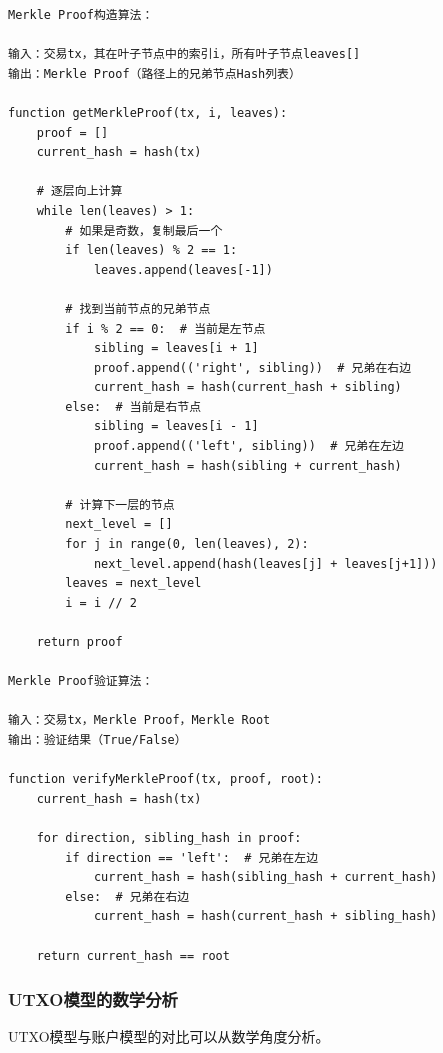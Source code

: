﻿\documentclass[12pt,a4paper]{article}
\begin{document}
\begin{lstlisting}
Merkle Proof构造算法：

输入：交易tx，其在叶子节点中的索引i，所有叶子节点leaves[]
输出：Merkle Proof（路径上的兄弟节点Hash列表）

function getMerkleProof(tx, i, leaves):
    proof = []
    current_hash = hash(tx)
    
    # 逐层向上计算
    while len(leaves) > 1:
        # 如果是奇数，复制最后一个
        if len(leaves) % 2 == 1:
            leaves.append(leaves[-1])
        
        # 找到当前节点的兄弟节点
        if i % 2 == 0:  # 当前是左节点
            sibling = leaves[i + 1]
            proof.append(('right', sibling))  # 兄弟在右边
            current_hash = hash(current_hash + sibling)
        else:  # 当前是右节点
            sibling = leaves[i - 1]
            proof.append(('left', sibling))  # 兄弟在左边
            current_hash = hash(sibling + current_hash)
        
        # 计算下一层的节点
        next_level = []
        for j in range(0, len(leaves), 2):
            next_level.append(hash(leaves[j] + leaves[j+1]))
        leaves = next_level
        i = i // 2
    
    return proof

Merkle Proof验证算法：

输入：交易tx，Merkle Proof，Merkle Root
输出：验证结果（True/False）

function verifyMerkleProof(tx, proof, root):
    current_hash = hash(tx)
    
    for direction, sibling_hash in proof:
        if direction == 'left':  # 兄弟在左边
            current_hash = hash(sibling_hash + current_hash)
        else:  # 兄弟在右边
            current_hash = hash(current_hash + sibling_hash)
    
    return current_hash == root
\end{lstlisting}

\subsubsection{UTXO模型的数学分析}

UTXO模型与账户模型的对比可以从数学角度分析。
\end{document}
